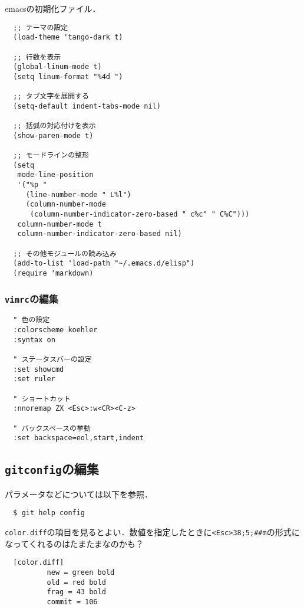 \documentclass[a4paper]{jsarticle}
\begin{document}
emacsの初期化ファイル．
\begin{lstlisting}
  ;; テーマの設定
  (load-theme 'tango-dark t)
  
  ;; 行数を表示
  (global-linum-mode t)
  (setq linum-format "%4d ")
  
  ;; タブ文字を展開する
  (setq-default indent-tabs-mode nil)
  
  ;; 括弧の対応付けを表示
  (show-paren-mode t)
  
  ;; モードラインの整形
  (setq
   mode-line-position
   '("%p "
     (line-number-mode " L%l")
     (column-number-mode
      (column-number-indicator-zero-based " c%c" " C%C")))
   column-number-mode t
   column-number-indicator-zero-based nil)
  
  ;; その他モジュールの読み込み
  (add-to-list 'load-path "~/.emacs.d/elisp")
  (require 'markdown)
\end{lstlisting}

\subsubsection{\texttt{vimrc}の編集}
\begin{lstlisting}
  " 色の設定
  :colorscheme koehler
  :syntax on
  
  " ステータスバーの設定
  :set showcmd
  :set ruler
  
  " ショートカット
  :nnoremap ZX <Esc>:w<CR><C-z>
  
  " バックスペースの挙動
  :set backspace=eol,start,indent
\end{lstlisting}

\subsection{\texttt{gitconfig}の編集}
パラメータなどについては以下を参照．
\begin{lstlisting}
  $ git help config
\end{lstlisting}
\texttt{color.diff}の項目を見るとよい．数値を指定したときに\texttt{<Esc>38;5;\#\#m}の形式になってくれるのはたまたまなのかも？
\begin{lstlisting}
  [color.diff]
          new = green bold
          old = red bold
          frag = 43 bold
          commit = 106
\end{lstlisting}
\end{document}

